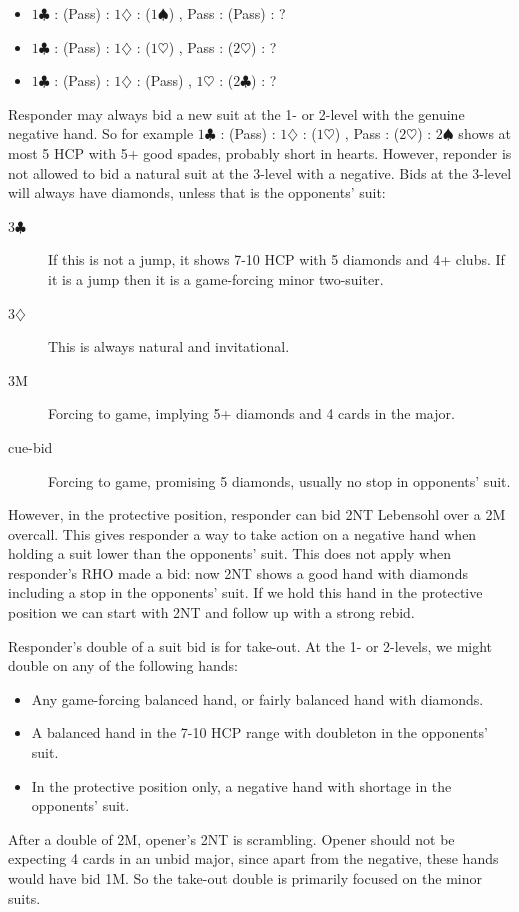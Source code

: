 \documentclass{article}
\newcommand{\sz}{\spadesuit}
\newcommand{\hz}{\heartsuit}
\newcommand{\dz}{\diamondsuit}
\newcommand{\cz}{\clubsuit}
\begin{document}
\begin{itemize}
\item $1\cz$ : (Pass) : $1\dz$ : ($1\sz$) , Pass : (Pass) : ?
\item $1\cz$ : (Pass) : $1\dz$ : ($1\hz$) , Pass : ($2\hz$) : ?
\item $1\cz$ : (Pass) : $1\dz$ : (Pass) , $1\hz$ : ($2\cz$) : ?
\end{itemize}

Responder may always bid a new suit at the 1- or 2-level with the genuine negative hand. So for example $1\cz$ : (Pass) : $1\dz$ : ($1\hz$) , Pass : ($2\hz$) : $2\sz$ shows at most 5 HCP with 5+ good spades, probably short in hearts. However, reponder is not allowed to bid a natural suit at the 3-level with a negative. Bids at the 3-level will always have diamonds, unless that is the opponents' suit:
\begin{description}
\item[3$\cz$] If this is not a jump, it shows 7-10 HCP with 5 diamonds and 4+ clubs. If it is a jump then it is a game-forcing minor two-suiter.
\item[3$\dz$] This is always natural and invitational.
\item[3M] Forcing to game, implying 5+ diamonds and 4 cards in the major.
\item[cue-bid] Forcing to game, promising 5 diamonds, usually no stop in opponents' suit.
\end{description}

However, in the protective position, responder can bid 2NT Lebensohl over a 2M overcall. This gives responder a way to take action on a negative hand when holding a suit lower than the opponents' suit. This does not apply when responder's RHO made a bid: now 2NT shows a good hand with diamonds including a stop in the opponents' suit. If we hold this hand in the protective position we can start with 2NT and follow up with a strong rebid.

Responder's double of a suit bid is for take-out. At the 1- or 2-levels, we might double on any of the following hands:
\begin{itemize}
\item Any game-forcing balanced hand, or fairly balanced hand with diamonds.
\item A balanced hand in the 7-10 HCP range with doubleton in the opponents' suit.
\item In the protective position only, a negative hand with shortage in the opponents' suit.
\end{itemize}
After a double of 2M, opener's 2NT is scrambling. Opener should not be expecting 4 cards in an unbid major, since apart from the negative, these hands would have bid 1M. So the take-out double is primarily focused on the minor suits.
\end{document}
